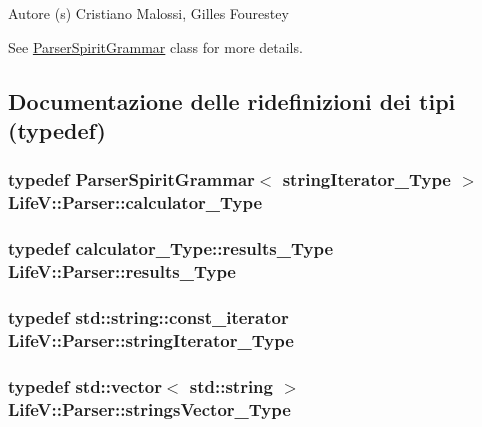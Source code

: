 \begin{DoxyAuthor}{Autore}
(s) Cristiano Malossi, Gilles Fourestey
\end{DoxyAuthor}
See {\ttfamily \hyperlink{classLifeV_1_1ParserSpiritGrammar}{Parser\-Spirit\-Grammar}} class for more details. 

\subsection{Documentazione delle ridefinizioni dei tipi (typedef)}
\hypertarget{classLifeV_1_1Parser_ae9a67e24d777a1f962026f5e1274b61a}{
\subsubsection[{calculator\-\_\-\-Type}]{\setlength{\rightskip}{0pt plus 5cm}typedef {\bf Parser\-Spirit\-Grammar}$<$ {\bf string\-Iterator\-\_\-\-Type} $>$ {\bf Life\-V\-::\-Parser\-::calculator\-\_\-\-Type}}}\label{classLifeV_1_1Parser_ae9a67e24d777a1f962026f5e1274b61a}
\hypertarget{classLifeV_1_1Parser_a9e5861cc337d7534e8641b1709d193db}{
\subsubsection[{results\-\_\-\-Type}]{\setlength{\rightskip}{0pt plus 5cm}typedef {\bf calculator\-\_\-\-Type\-::results\-\_\-\-Type} {\bf Life\-V\-::\-Parser\-::results\-\_\-\-Type}}}\label{classLifeV_1_1Parser_a9e5861cc337d7534e8641b1709d193db}
\hypertarget{classLifeV_1_1Parser_a9491c77a9093b41468ca54b865c893ff}{
\subsubsection[{string\-Iterator\-\_\-\-Type}]{\setlength{\rightskip}{0pt plus 5cm}typedef std\-::string\-::const\-\_\-iterator {\bf Life\-V\-::\-Parser\-::string\-Iterator\-\_\-\-Type}}}\label{classLifeV_1_1Parser_a9491c77a9093b41468ca54b865c893ff}
\hypertarget{classLifeV_1_1Parser_af87d4a11879da16a0bba7bf81f98b957}{
\subsubsection[{strings\-Vector\-\_\-\-Type}]{\setlength{\rightskip}{0pt plus 5cm}typedef std\-::vector$<$ std\-::string $>$ {\bf Life\-V\-::\-Parser\-::strings\-Vector\-\_\-\-Type}}}\label{classLifeV_1_1Parser_af87d4a11879da16a0bba7bf81f98b957}


